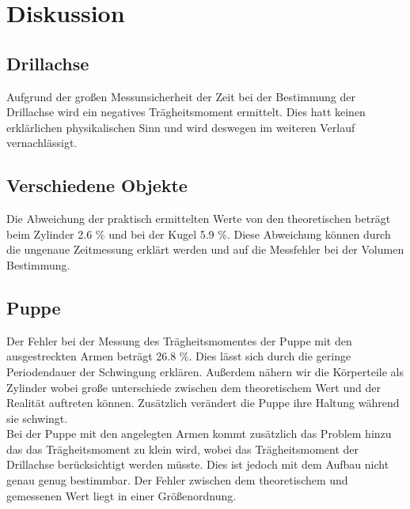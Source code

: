 \section{Diskussion}
\label{sec:Diskussion}
\subsection{Drillachse}
Aufgrund der großen Messunsicherheit der Zeit bei der Bestimmung der Drillachse wird ein negatives Trägheitsmoment ermittelt. Dies hatt keinen erklärlichen physikalischen Sinn und wird deswegen im weiteren Verlauf vernachlässigt. 

\subsection{Verschiedene Objekte}
Die Abweichung der praktisch ermittelten Werte von den theoretischen beträgt beim Zylinder  2.6 \% und bei der Kugel 5.9 \%. Diese Abweichung können durch die ungenaue Zeitmessung erklärt werden und auf die Messfehler bei der Volumen Bestimmung.

\subsection{Puppe}
Der Fehler bei der Messung des Trägheitsmomentes der Puppe mit den ausgestreckten Armen beträgt 26.8 \%. Dies lässt sich durch die geringe Periodendauer der Schwingung erklären. Außerdem nähern wir die Körperteile als Zylinder wobei große unterschiede zwischen dem theoretischem Wert und der Realität auftreten können. Zusätzlich verändert die Puppe ihre Haltung während sie schwingt.
\ \\
Bei der Puppe mit den angelegten Armen kommt zusätzlich das Problem hinzu das das Trägheitsmoment zu klein wird, wobei das Trägheitsmoment der Drillachse berücksichtigt werden müsste. Dies ist jedoch mit dem Aufbau nicht genau genug bestimmbar. Der Fehler zwischen dem theoretischem und gemessenen Wert liegt in einer Größenordnung.
